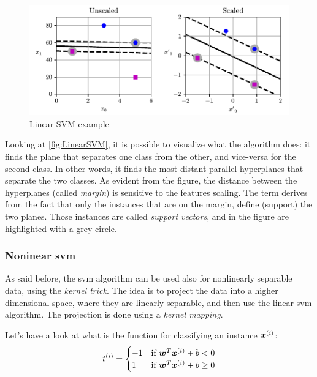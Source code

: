 \begin{figure}
    \centering
    \includegraphics[width=\textwidth]{images/MachineLearning/LinearSVM.pdf}
    \caption{Linear SVM example }
    \label{fig:LinearSVM}
\end{figure}

Looking at \autoref{fig:LinearSVM}, it is possible to visualize what the algorithm does: it finds the plane that separates one class from the other, and vice-versa for the second class. In other words, it finds the most distant parallel hyperplanes that separate the two classes. As evident from the figure, the distance between the hyperplanes (called \emph{margin}) is sensitive to the features scaling. The term  derives from the fact that only the instances that are on the margin, define (support) the two planes. Those instances are called \emph{support vectors}, and in the figure are highlighted with a grey circle.

\subsubsection{Noninear \gls{svm}}
\label{subsubsec:NoninearSVM}
As said before, the \gls{svm} algorithm can be used also for nonlinearly separable data, using the \emph{kernel trick}. The idea is to project the data into a higher dimensional space, where they are linearly separable, and then use the linear \gls{svm} algorithm. The projection is done using a \emph{kernel mapping}. 

Let's have a look at what is the function for classifying an instance $\bm{x}^{(i)}$:
\begin{equation}
    t^{(i)} = \begin{cases}
        -1 & \text{if } \bm{w}^T\bm{x}^{(i)} + b < 0 \\
        1 & \text{if } \bm{w}^T\bm{x}^{(i)} + b \geq 0 
    \end{cases}
\end{equation}

